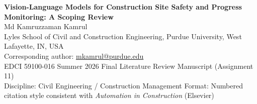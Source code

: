 \documentclass[10pt,letterpaper]{article}
\begin{document}
\begin{center}
{\Large\bfseries\color{headingblue} Vision-Language Models for Construction Site Safety and Progress Monitoring: A Scoping Review}\\[0.5em]
{\normalsize Md Kamruzzaman Kamrul}\\[0.15em]
{\small Lyles School of Civil and Construction Engineering, Purdue University, West Lafayette, IN, USA}\\[0.15em]
{\small Corresponding author: \href{mailto:mkamrul@purdue.edu}{mkamrul@purdue.edu}}\\[0.2em]
{\small EDCI 59100-016 \textbar{} Summer 2026 \textbar{} Final Literature Review Manuscript (Assignment 11)}\\[0.15em]
{\small Discipline: Civil Engineering / Construction Management \textbar{} Format: Numbered citation style consistent with \textit{Automation in Construction} (Elsevier)}
\end{center}

\vspace{0.3em}
\end{document}

